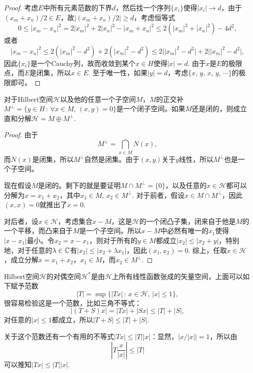 \begin{proof}
考虑$E$中所有元素范数的下界$d$，然后找一个序列$\{x_i\}$使得$|x_i|\to d$，由于$(x_m+x_n)/2\in E$，故$|(x_m+x_n)/2|\geq d$，考虑恒等式
\[
	0\leq |x_m-x_n|^2=2|x_m|^2+2|x_n|^2-|x_m+x_n|^2\leq 2(|x_m|^2+|x_n|^2)-4d^2,
\]
或者
\[
	|x_m-x_n|^2\leq 2(|x_m|^2-d^2)+2(|x_m|^2-d^2)\leq 2\bigl||x_m|^2-d^2\bigr|+2\bigl||x_m|^2-d^2\bigr|,
\]
因此$\{x_i\}$是一个Cauchy列，故而收敛到某个$x\in H$使得$|x|=d$. 由于$x$是$E$的极限点，而$E$是闭集，所以$x\in E$. 至于唯一性，如果$|y|=d$，考虑$\{x$, $y$, $x$, $y$, $\cdots\}$的极限即可。
\end{proof}

\begin{pro}
对于Hilbert空间$\mathcal{H}$以及他的任意一个子空间$M$，$M$的正交补$M^\bot=\{y\in H\,:\, \forall x\in M,\, (x,y)=0\}$是一个闭子空间。如果$M$还是闭的，则成立直和分解$\mathcal{H}=M\oplus M^\bot$.
\end{pro}

\begin{proof}
由于
\[
	M^\bot=\bigcap_{x\in M}N(x),
\]
而$N(x)$是闭集，所以$M^\bot$自然是闭集。由于$(x,y)$关于$y$线性，所以$M^\bot$也是一个子空间。

现在假设$M$是闭的。剩下的就是要证明$M\cap M^\bot=\{0\}$，以及任意的$x\in \mathcal{H}$都可以分解为$x=x_1+x_2$，其中$x_1\in M$, $x_2\in M^\bot$. 对于前者，假设$x\in M\cap M^\bot$，因此$(x,x)=0$就推出了$x=0$. 

对后者，设$x\in \mathcal{H}$，考虑集合$x-M$，这是$\mathcal{H}$的一个闭凸子集，闭来自于他是$M$的一个平移，而凸来自于$M$是一个子空间。所以$x-M$中必然有唯一的$x_1$使得$|x-x_1|$最小。令$x_2=x-x_1$，则对于所有的$y\in M$都成立$|x_2|\leq |x_2+y|$，特别地，对于任意的$\lambda\in \mathbb{C}$有$|x_2|\leq |x_2+\lambda x_1|$，因此$(x_1,x_2)=0$. 综上，任取$x\in \mathcal{H}$，成立分解$x=x_1+x_2$，$x_1\in M$，而$x_2\in M^\bot$.
\end{proof}

\begin{para}
Hilbert空间$\mathcal{H}$的对偶空间$\mathcal{H}^*$是由$\mathcal{H}$上所有线性函数张成的矢量空间，上面可以如下赋予范数
\[
	|T|=\sup\bigl\{|Tx|\,:\,x\in \mathcal{H},\,|x|\leq 1\bigr\},
\]
很容易检验这是一个范数，比如三角不等式：
\[
	|(T+S)x|=|Tx|+|Sx|\leq |T|+|S|,
\]
对任意的$|x|\leq 1$都成立，所以$|T+S|\leq |T|+|S|$.

关于这个范数还有一个有用的不等式$|Tx|\leq |T||x|$：显然，$|x/|x||=1$，所以由
\[
	\left|T\frac{x}{|x|}\right|\leq |T|
\]
可以推知$|Tx|\leq |T||x|$. 
\end{para}

